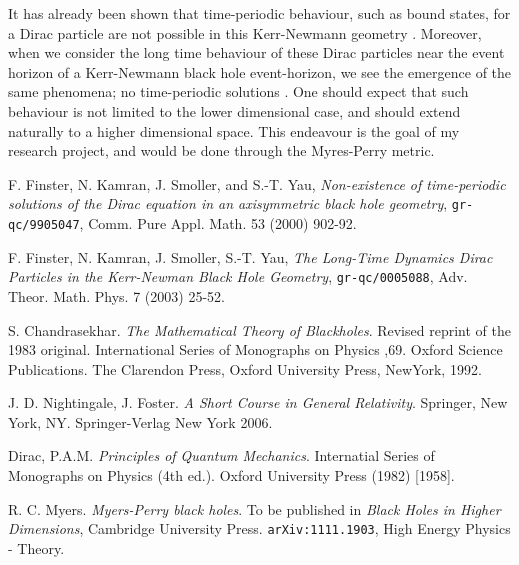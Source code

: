 \documentclass[12pt]{article}
\begin{document}
It has already been shown that time-periodic behaviour, such as bound states, for a Dirac particle are not possible in this Kerr-Newmann geometry \cite{cpam}. Moreover, when we consider the long time behaviour of these Dirac particles near the event horizon of a Kerr-Newmann black hole event-horizon, we see the emergence of the same phenomena; no time-periodic solutions \cite{atmp}. One should expect that such behaviour is not limited to the lower dimensional case, and should extend naturally to a higher dimensional space. This endeavour is the goal of my research project, and would be done through the Myres-Perry metric.


\newpage
\begin{thebibliography}{9}
  F. Finster, N. Kamran, J. Smoller, and S.-T. Yau, \textit{Non-existence of time-periodic solutions of the Dirac equation in an axisymmetric black hole geometry}, \texttt{gr-qc/9905047}, Comm. Pure Appl. Math. 53 (2000) 902-92.

  F. Finster, N. Kamran, J. Smoller, S.-T. Yau, \textit{The Long-Time Dynamics Dirac Particles in the Kerr-Newman Black Hole Geometry}, \texttt{gr-qc/0005088}, Adv. Theor. Math. Phys. 7 (2003) 25-52.

  S. Chandrasekhar. \textit{The Mathematical Theory of Blackholes}. Revised reprint of the 1983 original. International Series of Monographs on Physics ,69. Oxford Science Publications. The Clarendon Press, Oxford University Press, NewYork, 1992.	

  J. D. Nightingale, J. Foster. \textit{A Short Course in General Relativity}. Springer, New York, NY. Springer-Verlag New York 2006.

  Dirac, P.A.M. \textit{Principles of Quantum Mechanics}. Internatial Series of Monographs on Physics (4th ed.). Oxford University Press (1982) [1958].

  R. C. Myers. \textit{Myers-Perry black holes}. To be published in \textit{Black Holes in Higher Dimensions}, Cambridge University Press. \texttt{arXiv:1111.1903}, High Energy Physics - Theory.
  
\end{thebibliography}
\end{document}
